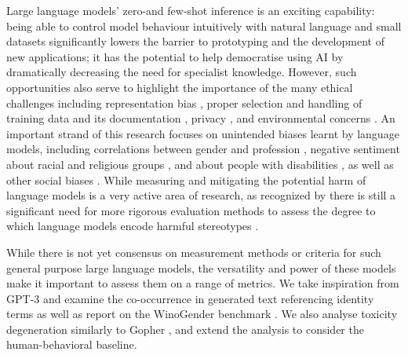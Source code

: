 \documentclass{article}
\begin{document}
Large language models' zero-and few-shot inference is an exciting capability: being able to control model behaviour intuitively with natural language and small datasets significantly lowers the barrier to prototyping and the development of new applications; it has the potential to help democratise using AI by dramatically decreasing the need for specialist knowledge. However, such opportunities also serve to highlight the importance of the many ethical challenges \cite{leidner-plachouras-2017-ethical,bender2021on,bommasani2021opportunities} including representation bias \cite{blodgett-etal-2020-language}, proper selection and handling of training data \cite{rogers-2021-changing} and its documentation \cite{bender-friedman-2018-data}, privacy \cite{privacy2016,carlini2021extracting}, and environmental concerns \cite{strubell-etal-2019-energy,patterson2021carbon}. An important strand of this research focuses on unintended biases learnt by language models, including correlations between gender and profession \citep{bolukbasi2016man,rudinger2018gender,zhao-etal-2018-gender}, negative sentiment about racial and religious groups \cite{li2020unqovering, nadeem2020stereoset}, and about people with disabilities \citep{hutchinson2020social}, as well as other social biases \citep{caliskan2017,rudinger-etal-2017-social,sap-etal-2020-social,sotnikova2021analyzing}. While measuring and mitigating the potential harm of language models is a very active area of research, as recognized by \citet{blodgett2021stereotyping,jacobs2021measuring} there is still a significant need for more rigorous evaluation methods to assess the degree to which language models encode harmful stereotypes \citep{may-etal-2019-measuring,webster2021measuring}.



While there is not yet consensus on measurement methods or criteria for such general purpose large language models, the versatility and power of these models make it important to assess them on a range of metrics. We take inspiration from GPT-3 \citep{NEURIPS2020_gpt3} and examine the co-occurrence in generated text referencing identity terms as well as report on the WinoGender benchmark \citep{rudinger2018gender}. We also analyse toxicity degeneration similarly to Gopher \citep{gopher2021}, and extend the analysis to consider the human-behavioral baseline. 
\end{document}
